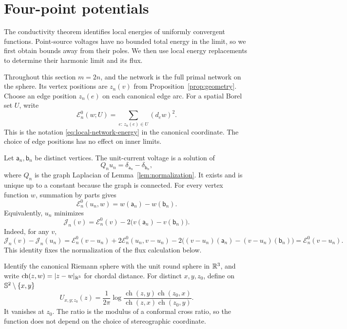 \section{Four-point potentials}\label{sec:green}

The conductivity theorem identifies local energies of uniformly convergent
functions.  Point-source voltages have no bounded total energy in the
limit, so we first obtain bounds away from their poles.  We then use local
energy replacements to determine their harmonic limit and its flux.

Throughout this section \(m=2n\), and the network is the full primal
network on the sphere.  Its vertex positions are \(z_n(v)\) from
Proposition~\ref{prop:geometry}.  Choose an edge position \(z_n(e)\) on
each canonical edge arc.  For a spatial Borel set \(U\), write
\[
 \mathcal E_n^0(w;U)
   =\sum_{e:\,z_n(e)\in U}(d_e w)^2.
\]
This is the notation \eqref{eq:local-network-energy} in the canonical
coordinate.  The choice of edge positions has no effect on inner limits.

Let \(\mathsf a_n,\mathsf b_n\) be distinct vertices.  The unit-current voltage is a
solution of
\begin{equation}\label{eq:point-current}
                   Q_n u_n=\delta_{\mathsf a_n}-\delta_{\mathsf b_n},
\end{equation}
where \(Q_n\) is the graph Laplacian of Lemma~\ref{lem:normalization}.
It exists and is unique up to a constant because the graph is connected.
For every vertex function \(w\), summation by parts gives
\begin{equation}\label{eq:point-current-weak}
 \mathcal E_n^0(u_n,w)=w(\mathsf a_n)-w(\mathsf b_n).
\end{equation}
Equivalently, \(u_n\) minimizes
\begin{equation}\label{eq:source-functional}
 \mathcal J_n(v)
     =\mathcal E_n^0(v)-2\bigl(v(\mathsf a_n)-v(\mathsf b_n)\bigr).
\end{equation}
Indeed, for any \(v\),
\[
 \mathcal J_n(v)-\mathcal J_n(u_n)
 =\mathcal E_n^0(v-u_n)
   +2\mathcal E_n^0(u_n,v-u_n)
   -2\bigl((v-u_n)(\mathsf a_n)-(v-u_n)(\mathsf b_n)\bigr)
 =\mathcal E_n^0(v-u_n).
\]
This identity fixes the normalization of the flux calculation below.

Identify the canonical Riemann sphere with the unit round sphere in
\(\mathbb R^3\), and write
\(\operatorname{ch}(z,w)=\lvert z-w\rvert_{\mathbb R^3}\) for chordal distance.
For distinct \(x,y,z_0\), define on \(\mathbb S^2\setminus\{x,y\}\)
\begin{equation}\label{eq:round-voltage}
 U_{x,y;z_0}(z)
   =\frac1{2\pi}
       \log\frac{\operatorname{ch}(z,y)\operatorname{ch}(z_0,x)}
                     {\operatorname{ch}(z,x)\operatorname{ch}(z_0,y)}.
\end{equation}
It vanishes at \(z_0\).  The ratio is the modulus of a conformal cross
ratio, so the function does not depend on the choice of stereographic
coordinate.

